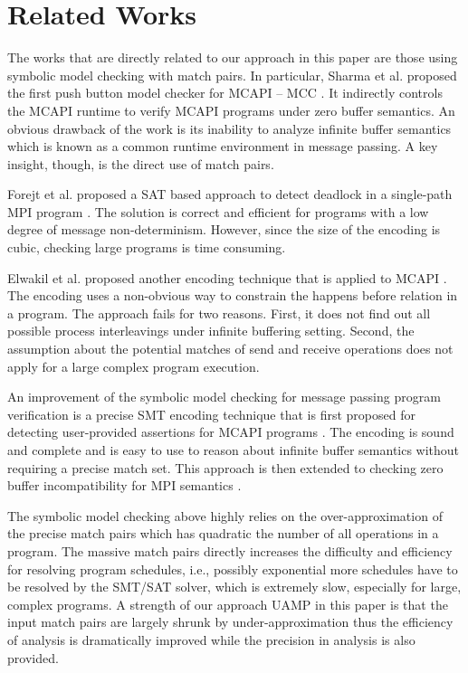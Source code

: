 \section{Related Works}
The works that are directly related to our approach in this paper are those using symbolic model checking with match pairs. In particular, 
Sharma et al. proposed the first push button model checker for MCAPI -- MCC \cite{DBLP:conf/fmcad/SharmaGMH09}. It indirectly controls the MCAPI runtime to verify MCAPI programs under zero buffer semantics. An obvious drawback of the work is its inability to analyze infinite buffer semantics which is known as a common runtime environment in message passing. A key insight, though, is the direct use of match pairs.

Forejt et al. proposed a SAT based approach to detect deadlock in a single-path MPI program \cite{DBLP:conf/fm/ForejtKNS14,DBLP:journals/toplas/ForejtJKNS17}. The solution is correct and efficient for programs with a low degree of message non-determinism. However, since the size of the encoding is cubic, checking large programs is time consuming.

Elwakil et al. proposed another encoding technique that is applied to MCAPI \cite{DBLP:conf/atva/ElwakilYW10,DBLP:conf/issta/ElwakilY10}. The encoding uses a non-obvious way to constrain the happens before relation in a program. The approach fails for two reasons. First, it does not find out all possible process interleavings under infinite buffering setting. Second, the assumption about the potential matches of send and receive operations does not apply for a large complex program execution. 

An improvement of the symbolic model checking for message passing program verification is a precise SMT encoding technique that is first proposed for detecting user-provided assertions for MCAPI programs \cite{DBLP:conf/kbse/HuangMM13}. The encoding is sound and complete and is easy to use to reason about infinite buffer semantics without requiring a precise match set. %
This approach is then extended to checking zero buffer incompatibility for MPI semantics \cite{HuangNFM15}. 

The symbolic model checking above highly relies on the over-approximation of the precise match pairs which has quadratic the number of all operations in a program. The massive match pairs directly increases the difficulty and efficiency for resolving program schedules, i.e., possibly exponential more schedules have to be resolved by the SMT/SAT solver, which is extremely slow, especially for large, complex programs. 
A strength of our approach UAMP in this paper is that the input match pairs are largely shrunk by under-approximation thus the efficiency of analysis is dramatically improved while the precision in analysis is also provided.


